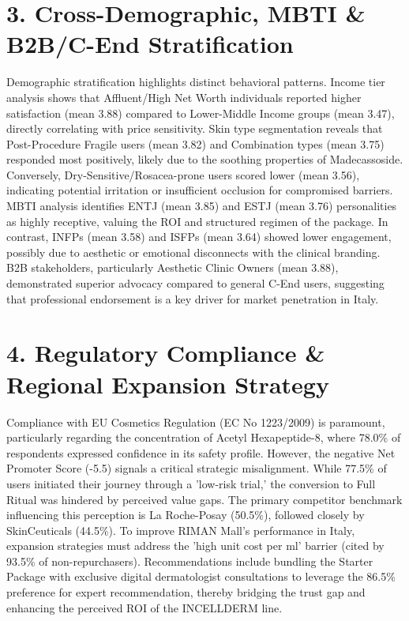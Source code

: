 \documentclass[10pt,twocolumn,a4paper]{article}
\begin{document}
\section{3. Cross-Demographic, MBTI \& B2B/C-End Stratification}
Demographic stratification highlights distinct behavioral patterns. Income tier analysis shows that Affluent/High Net Worth individuals reported higher satisfaction (mean 3.88) compared to Lower-Middle Income groups (mean 3.47), directly correlating with price sensitivity. Skin type segmentation reveals that Post-Procedure Fragile users (mean 3.82) and Combination types (mean 3.75) responded most positively, likely due to the soothing properties of Madecassoside. Conversely, Dry-Sensitive/Rosacea-prone users scored lower (mean 3.56), indicating potential irritation or insufficient occlusion for compromised barriers. MBTI analysis identifies ENTJ (mean 3.85) and ESTJ (mean 3.76) personalities as highly receptive, valuing the ROI and structured regimen of the package. In contrast, INFPs (mean 3.58) and ISFPs (mean 3.64) showed lower engagement, possibly due to aesthetic or emotional disconnects with the clinical branding. B2B stakeholders, particularly Aesthetic Clinic Owners (mean 3.88), demonstrated superior advocacy compared to general C-End users, suggesting that professional endorsement is a key driver for market penetration in Italy.
\section{4. Regulatory Compliance \& Regional Expansion Strategy}
Compliance with EU Cosmetics Regulation (EC No 1223/2009) is paramount, particularly regarding the concentration of Acetyl Hexapeptide-8, where 78.0\% of respondents expressed confidence in its safety profile. However, the negative Net Promoter Score (-5.5) signals a critical strategic misalignment. While 77.5\% of users initiated their journey through a 'low-risk trial,' the conversion to Full Ritual was hindered by perceived value gaps. The primary competitor benchmark influencing this perception is La Roche-Posay (50.5\%), followed closely by SkinCeuticals (44.5\%). To improve RIMAN Mall's performance in Italy, expansion strategies must address the 'high unit cost per ml' barrier (cited by 93.5\% of non-repurchasers). Recommendations include bundling the Starter Package with exclusive digital dermatologist consultations to leverage the 86.5\% preference for expert recommendation, thereby bridging the trust gap and enhancing the perceived ROI of the INCELLDERM line.
\end{document}
